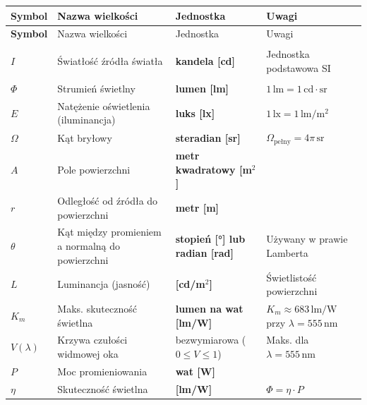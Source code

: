 \documentclass[12pt,a4paper]{article}
\begin{document}
\begin{longtable}{>{\bfseries}p{1.6cm} p{6.5cm} p{3.2cm} p{3.5cm}}
\toprule
\rowcolor{headercolor}
\color{white}Symbol &
\color{white}Nazwa wielkości &
\color{white}Jednostka &
\color{white}Uwagi \\
\midrule
\endfirsthead
\toprule
\rowcolor{headercolor}
\color{white}Symbol &
\color{white}Nazwa wielkości &
\color{white}Jednostka &
\color{white}Uwagi \\
\midrule
\endhead
\bottomrule
\endfoot

\rowcolor{rowfoto}
$I$     & Światłość źródła światła
        & \textbf{kandela [cd]}
        & Jednostka podstawowa SI \\

\rowcolor{rowfoto}
$\Phi$  & Strumień świetlny
        & \textbf{lumen [lm]}
        & $1\,\mathrm{lm} = 1\,\mathrm{cd\cdot sr}$ \\

\rowcolor{rowfoto}
$E$     & Natężenie oświetlenia (iluminancja)
        & \textbf{luks [lx]}
        & $1\,\mathrm{lx} = 1\,\mathrm{lm/m^2}$ \\

\rowcolor{rowfoto}
$\Omega$ & Kąt bryłowy
        & \textbf{steradian [sr]}
        & $\Omega_{\text{pełny}} = 4\pi\,\mathrm{sr}$ \\

\rowcolor{rowfoto}
$A$     & Pole powierzchni
        & \textbf{metr kwadratowy [m$^2$]}
        & \\

\rowcolor{rowfoto}
$r$     & Odległość od źródła do powierzchni
        & \textbf{metr [m]}
        & \\

\rowcolor{rowfoto}
$\theta$ & Kąt między promieniem a normalną
          do powierzchni
        & \textbf{stopień [°] lub radian [rad]}
        & Używany w prawie Lamberta \\

\rowcolor{rowfoto}
$L$     & Luminancja (jasność)
        & \textbf{[cd/m$^2$]}
        & Świetlistość powierzchni \\

\rowcolor{rowfoto}
$K_m$   & Maks. skuteczność świetlna
        & \textbf{lumen na wat [lm/W]}
        & $K_m \approx 683\,\mathrm{lm/W}$ przy $\lambda=555\,\mathrm{nm}$ \\

\rowcolor{rowfoto}
$V(\lambda)$ & Krzywa czułości widmowej oka
        & bezwymiarowa ($0\leq V\leq 1$)
        & Maks. dla $\lambda=555\,\mathrm{nm}$ \\

\rowcolor{rowfoto}
$P$     & Moc promieniowania
        & \textbf{wat [W]}
        & \\

\rowcolor{rowfoto}
$\eta$  & Skuteczność świetlna
        & \textbf{[lm/W]}
        & $\Phi = \eta \cdot P$ \\

\end{longtable}
\end{document}
